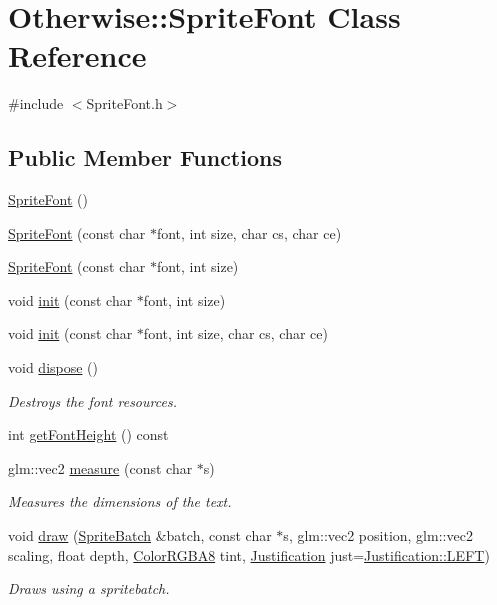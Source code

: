 \hypertarget{class_otherwise_1_1_sprite_font}{}\section{Otherwise\+:\+:Sprite\+Font Class Reference}
\label{class_otherwise_1_1_sprite_font}


{\ttfamily \#include $<$Sprite\+Font.\+h$>$}

\subsection*{Public Member Functions}
\begin{DoxyCompactItemize}
\item 
\hyperlink{class_otherwise_1_1_sprite_font_aef9bd7e1b5bb753be2124109865e4444}{Sprite\+Font} ()
\item 
\hyperlink{class_otherwise_1_1_sprite_font_a0fd2ed71696d52880b84db3e148b2c36}{Sprite\+Font} (const char $\ast$font, int size, char cs, char ce)
\item 
\hyperlink{class_otherwise_1_1_sprite_font_a0406169f2958c4d6f96fc4d82c0faf22}{Sprite\+Font} (const char $\ast$font, int size)
\item 
void \hyperlink{class_otherwise_1_1_sprite_font_a26716712928e6dfab852320a2d6d29e8}{init} (const char $\ast$font, int size)
\item 
void \hyperlink{class_otherwise_1_1_sprite_font_af469b7a1b428e4758fa317c0b021c481}{init} (const char $\ast$font, int size, char cs, char ce)
\item 
void \hyperlink{class_otherwise_1_1_sprite_font_a304cfd3e85f149f2f3346cb10cfcbcf9}{dispose} ()
\begin{DoxyCompactList}\small\item\em Destroys the font resources. \end{DoxyCompactList}\item 
int \hyperlink{class_otherwise_1_1_sprite_font_ae6a8a5b1525ec7563fe5a89e91de5707}{get\+Font\+Height} () const
\item 
glm\+::vec2 \hyperlink{class_otherwise_1_1_sprite_font_a0674639c45766ae5fc4643d66d017e17}{measure} (const char $\ast$s)
\begin{DoxyCompactList}\small\item\em Measures the dimensions of the text. \end{DoxyCompactList}\item 
void \hyperlink{class_otherwise_1_1_sprite_font_a4da78ead7aab2d809008891f126e43fc}{draw} (\hyperlink{class_otherwise_1_1_sprite_batch}{Sprite\+Batch} \&batch, const char $\ast$s, glm\+::vec2 position, glm\+::vec2 scaling, float depth, \hyperlink{struct_otherwise_1_1_color_r_g_b_a8}{Color\+R\+G\+B\+A8} tint, \hyperlink{namespace_otherwise_a9eef3c22cbba8efff0211f92a1ed2792}{Justification} just=\hyperlink{namespace_otherwise_a9eef3c22cbba8efff0211f92a1ed2792a684d325a7303f52e64011467ff5c5758}{Justification\+::\+L\+E\+FT})
\begin{DoxyCompactList}\small\item\em Draws using a spritebatch. \end{DoxyCompactList}\end{DoxyCompactItemize}
